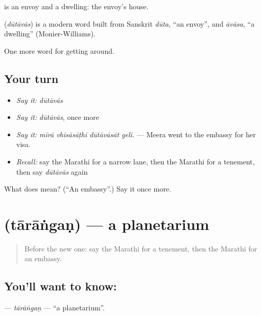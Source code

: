  is an envoy and  a dwelling: the envoy’s house.

\begin{cousinweb}
\textbf{} (\emph{dūtāvās}) is a modern word built from Sanskrit \emph{dūta}, \textquotedblleft{}an envoy\textquotedblright{}, and \emph{āvāsa}, \textquotedblleft{}a dwelling\textquotedblright{} (Monier-Williams).
\end{cousinweb}

\begin{grammarlens}[title={What you've built}]
One more word for getting around.
\end{grammarlens}

\subsection*{Your turn}
\begin{itemize}
\raggedright
  \item \emph{Say it:} \emph{dūtāvās}
  \item \emph{Say it:} \emph{dūtāvās}, once more
  \item \emph{Say it:} \emph{mīrā vhisāsāṭhī dūtāvāsāt gelī.} — Meera went to the embassy for her visa.
  \item \emph{Recall:} say the Marathi for a narrow lane, then the Marathi for a tenement, then say \emph{dūtāvās} again
\end{itemize}

\begin{tcolorbox}[breakable,colback=teal!4,colframe=teal!35!black,title={Before you move on}]
What does  mean? (\textquotedblleft{}An embassy\textquotedblright{}.) Say it once more.
\end{tcolorbox}
\section[\texorpdfstring{\mr{तारांगण} (tārāṅgaṇ)}{तारांगण (tārāṅgaṇ)}]{ (tārāṅgaṇ) — a planetarium}

\label{lesson:MR-C420-tarangan}



\begin{quote}
Before the new one: say the Marathi for a tenement, then the Marathi for an embassy.
\end{quote}

\subsection*{You'll want to know: }
\textbf{} — \emph{tārāṅgaṇ} — \textquotedblleft{}a planetarium\textquotedblright{}.

